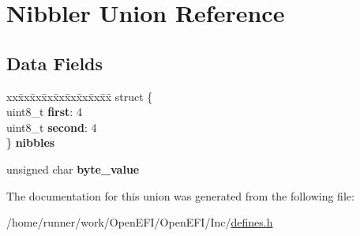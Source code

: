 \hypertarget{unionNibbler}{}\section{Nibbler Union Reference}
\label{unionNibbler}
\subsection*{Data Fields}
\begin{DoxyCompactItemize}
\item 
\mbox{\label{unionNibbler_ab55f8fc2c47324b8263502a4a59fce30}} 
\begin{tabbing}
xx\=xx\=xx\=xx\=xx\=xx\=xx\=xx\=xx\=\kill
struct \{\\
\>uint8\_t {\bfseries first}: 4\\
\>uint8\_t {\bfseries second}: 4\\
\} {\bfseries nibbles}\\

\end{tabbing}\item 
\mbox{\label{unionNibbler_a29c2996a6943ba133068f4e11c811866}} 
unsigned char {\bfseries byte\+\_\+value}
\end{DoxyCompactItemize}


The documentation for this union was generated from the following file\+:\begin{DoxyCompactItemize}
\item 
/home/runner/work/\+Open\+E\+F\+I/\+Open\+E\+F\+I/\+Inc/\hyperlink{defines_8h}{defines.\+h}\end{DoxyCompactItemize}
